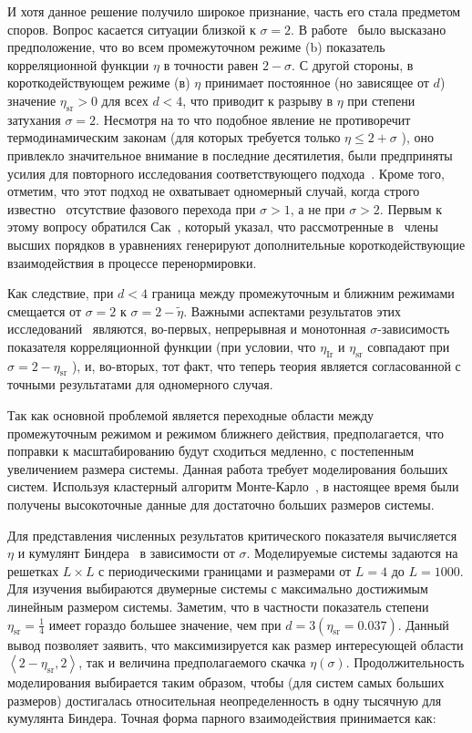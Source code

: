 И хотя данное решение получило широкое признание, часть его стала предметом споров. 
Вопрос касается ситуации близкой к $\sigma=2$.
В работе~\cite{10.1103/PhysRevLett.29.917} было высказано предположение, что во всем промежуточном режиме (b) показатель корреляционной функции $\eta$ в точности равен $2-\sigma$. 
С другой стороны, в короткодействующем режиме (в) $\eta$ принимает постоянное (но зависящее от $d$) значение $\eta_{\mathrm{sr}}>0$ для всех $d<4 $, что приводит к разрыву в $\eta$ при степени затухания $\sigma=2$.
Несмотря на то что подобное явление не противоречит термодинамическим законам (для которых требуется только $\eta\leq 2+\sigma$ ), оно привлекло значительное внимание в последние десятилетия, были предприняты усилия для повторного исследования соответствующего подхода~\cite{10.1103/PhysRevB.8.281, 10.1088/0305-4470/22/6/024}.
Кроме того, отметим, что этот подход не охватывает одномерный случай, когда строго известно~\cite{10.1007/BF01654281} отсутствие фазового перехода при $\sigma>1$, а не при $\sigma>2$. 
Первым к этому вопросу обратился Сак~\cite{10.1103/PhysRevB.8.281}, который указал, что рассмотренные в~\cite{10.1103/PhysRevLett.29.917} члены высших порядков в уравнениях генерируют дополнительные короткодействующие взаимодействия в процессе перенормировки.

Как следствие, при $d<4$ граница между промежуточным и ближним режимами смещается от $\sigma=2$ к $\sigma=2-\tilde{\eta}$.
Важными аспектами результатов этих исследований~\cite{10.1088/0305-4470/22/6/024} являются, во-первых, непрерывная и монотонная $\sigma$-зависимость показателя корреляционной функции (при условии, что $\eta_{\mathrm{Ir}}$ и $\eta_{\mathrm{sr}}$ совпадают при $\sigma=2-\eta_{\mathrm{sr}}$ ), и, во-вторых, тот факт, что теперь теория является согласованной с точными результатами для одномерного случая.

Так как основной проблемой является переходные области между промежуточным режимом и режимом ближнего действия, предполагается, что поправки к масштабированию будут сходиться медленно, с постепенным увеличением размера системы.
Данная работа требует моделирования больших систем. 
Используя кластерный алгоритм Монте-Карло~\cite{10.1142/S0129183195000265}, в настоящее время были получены высокоточные данные для достаточно больших размеров системы.

Для представления численных результатов критического показателя вычисляется $\eta$ и кумулянт Биндера~\cite{10.1007/BF01293604} в зависимости от $\sigma$. 
Моделируемые системы задаются на решетках $L\times L$ с периодическими границами и размерами от $L=4$ до $L=1000$. 
Для изучения выбираются двумерные системы с максимально достижимым линейным размером системы.
Заметим, что в частности показатель степени $\eta_{\mathrm{sr}}=\frac{1}{4}$ имеет гораздо большее значение, чем при $d=3\left(\eta_{\mathrm{sr}}=0.037\right)$. 
Данный вывод позволяет заявить, что максимизируется как размер интересующей области $\left\langle 2-\eta_{\mathrm{sr}}, 2\right\rangle$, так и величина предполагаемого скачка $\eta(\sigma)$.
Продолжительность моделирования выбирается таким образом, чтобы (для систем самых больших размеров) достигалась относительная неопределенность в одну тысячную для кумулянта Биндера.
Точная форма парного взаимодействия принимается как:

